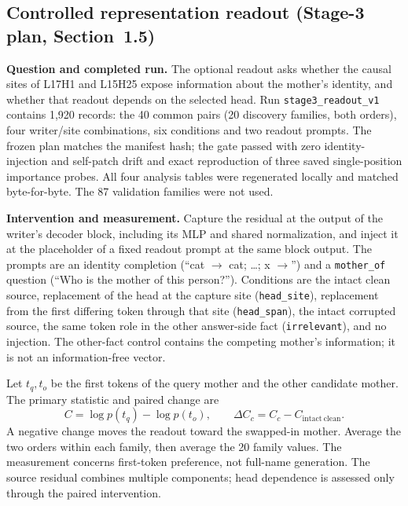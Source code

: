\subsection{Controlled representation readout (Stage-3 plan, Section~1.5)}
\label{sec:readout}
\textbf{Question and completed run.} The optional readout asks whether the causal
sites of L17H1 and L15H25 expose information about the mother's identity, and whether
that readout depends on the selected head. Run \texttt{stage3\_readout\_v1} contains
1{,}920 records: the 40 common pairs (20 discovery families, both orders), four
writer/site combinations, six conditions and two readout prompts. The frozen plan
matches the manifest hash; the gate passed with zero identity-injection and self-patch
drift and exact reproduction of three saved single-position importance probes. All
four analysis tables were regenerated locally and matched byte-for-byte. The 87
validation families were not used.

\textbf{Intervention and measurement.} Capture the residual at the output of the
writer's decoder block, including its MLP and shared normalization, and inject it at
the placeholder of a fixed readout prompt at the same block output. The prompts are
an identity completion (``cat $\to$ cat; \ldots; x $\to$'') and a
\texttt{mother\_of} question (``Who is the mother of this person?''). Conditions are
the intact clean source, replacement of the head at the capture site
(\texttt{head\_site}), replacement from the first differing token through that site
(\texttt{head\_span}), the intact corrupted source, the same token role in the other
answer-side fact (\texttt{irrelevant}), and no injection. The other-fact control
contains the competing mother's information; it is not an information-free vector.

Let $t_q,t_o$ be the first tokens of the query mother and the other candidate mother.
The primary statistic and paired change are
\[
 C=\log p(t_q)-\log p(t_o),\qquad
 \Delta C_c=C_c-C_{\mathrm{intact\ clean}}.
\]
A negative change moves the readout toward the swapped-in mother. Average the two
orders within each family, then average the 20 family values. The measurement concerns
first-token preference, not full-name generation. The source residual combines
multiple components; head dependence is assessed only through the paired intervention.

